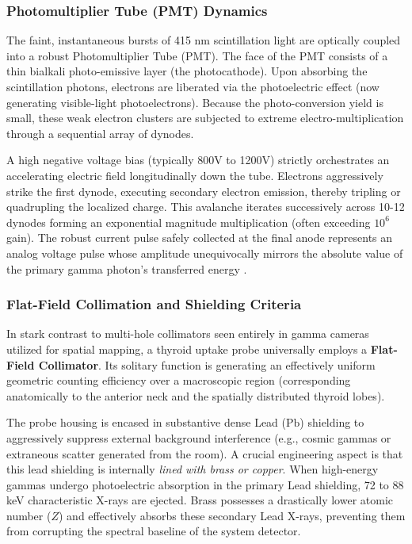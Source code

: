 \subsubsection{Photomultiplier Tube (PMT) Dynamics}
The faint, instantaneous bursts of 415 nm scintillation light are optically coupled into a robust Photomultiplier Tube (PMT). The face of the PMT consists of a thin bialkali photo-emissive layer (the photocathode). Upon absorbing the scintillation photons, electrons are liberated via the photoelectric effect (now generating visible-light photoelectrons). Because the photo-conversion yield is small, these weak electron clusters are subjected to extreme electro-multiplication through a sequential array of dynodes. 
\par
A high negative voltage bias (typically 800V to 1200V) strictly orchestrates an accelerating electric field longitudinally down the tube. Electrons aggressively strike the first dynode, executing secondary electron emission, thereby tripling or quadrupling the localized charge. This avalanche iterates successively across 10-12 dynodes forming an exponential magnitude multiplication (often exceeding $10^6$ gain). The robust current pulse safely collected at the final anode represents an analog voltage pulse whose amplitude unequivocally mirrors the absolute value of the primary gamma photon's transferred energy \cite{knoll2010radiation, cherry2012physics}.

\subsubsection{Flat-Field Collimation and Shielding Criteria}
In stark contrast to multi-hole collimators seen entirely in gamma cameras utilized for spatial mapping, a thyroid uptake probe universally employs a \textbf{Flat-Field Collimator}. Its solitary function is generating an effectively uniform geometric counting efficiency over a macroscopic region (corresponding anatomically to the anterior neck and the spatially distributed thyroid lobes). 
\par
The probe housing is encased in substantive dense Lead ($\text{Pb}$) shielding to aggressively suppress external background interference (e.g., cosmic gammas or extraneous scatter generated from the room). A crucial engineering aspect is that this lead shielding is internally \textit{lined with brass or copper}. When high-energy gammas undergo photoelectric absorption in the primary Lead shielding, 72 to 88 keV characteristic X-rays are ejected. Brass possesses a drastically lower atomic number ($Z$) and effectively absorbs these secondary Lead X-rays, preventing them from corrupting the spectral baseline of the system detector.

